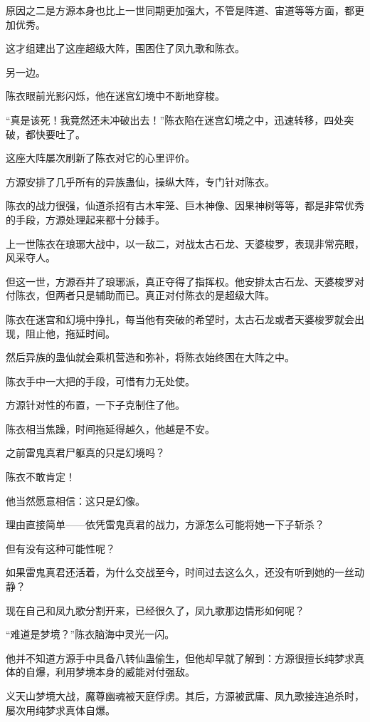 \begin{this_body}
原因之二是方源本身也比上一世同期更加强大，不管是阵道、宙道等等方面，都更加优秀。

这才组建出了这座超级大阵，围困住了凤九歌和陈衣。

另一边。

陈衣眼前光影闪烁，他在迷宫幻境中不断地穿梭。

“真是该死！我竟然还未冲破出去！”陈衣陷在迷宫幻境之中，迅速转移，四处突破，都快要吐了。

这座大阵屡次刷新了陈衣对它的心里评价。

方源安排了几乎所有的异族蛊仙，操纵大阵，专门针对陈衣。

陈衣的战力很强，仙道杀招有古木牢笼、巨木神像、因果神树等等，都是非常优秀的手段，方源处理起来都十分棘手。

上一世陈衣在琅琊大战中，以一敌二，对战太古石龙、天婆梭罗，表现非常亮眼，风采夺人。

但这一世，方源吞并了琅琊派，真正夺得了指挥权。他安排太古石龙、天婆梭罗对付陈衣，但两者只是辅助而已。真正对付陈衣的是超级大阵。

陈衣在迷宫和幻境中挣扎，每当他有突破的希望时，太古石龙或者天婆梭罗就会出现，阻止他，拖延时间。

然后异族的蛊仙就会乘机营造和弥补，将陈衣始终困在大阵之中。

陈衣手中一大把的手段，可惜有力无处使。

方源针对性的布置，一下子克制住了他。

陈衣相当焦躁，时间拖延得越久，他越是不安。

之前雷鬼真君尸躯真的只是幻境吗？

陈衣不敢肯定！

他当然愿意相信：这只是幻像。

理由直接简单——依凭雷鬼真君的战力，方源怎么可能将她一下子斩杀？

但有没有这种可能性呢？

如果雷鬼真君还活着，为什么交战至今，时间过去这么久，还没有听到她的一丝动静？

现在自己和凤九歌分割开来，已经很久了，凤九歌那边情形如何呢？

“难道是梦境？”陈衣脑海中灵光一闪。

他并不知道方源手中具备八转仙蛊偷生，但他却早就了解到：方源很擅长纯梦求真体的自爆，利用梦境本身的威能对付强敌。

义天山梦境大战，魔尊幽魂被天庭俘虏。其后，方源被武庸、凤九歌接连追杀时，屡次用纯梦求真体自爆。


\end{this_body}

